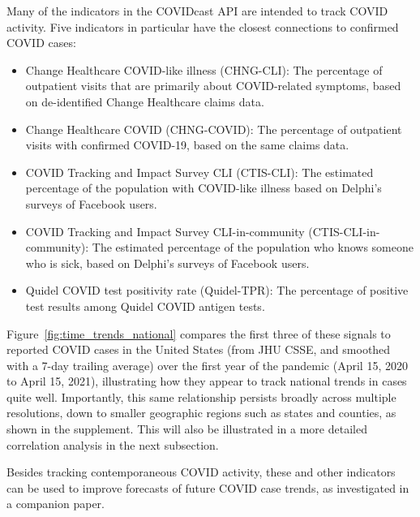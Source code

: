 \documentclass[9pt,twocolumn,twoside,lineno]{pnas-new}
\begin{document}
Many of the indicators in the COVIDcast API are intended to track COVID
activity. Five indicators in particular have the closest connections to
confirmed COVID cases:
\begin{itemize}
\item Change Healthcare COVID-like illness (CHNG-CLI): The percentage of
  outpatient visits that are primarily about COVID-related symptoms, based on
  de-identified Change Healthcare claims data.
\item Change Healthcare COVID (CHNG-COVID): The percentage of outpatient visits
  with confirmed COVID-19, based on the same claims data.
\item COVID Tracking and Impact Survey CLI (CTIS-CLI): The estimated percentage
  of the population with COVID-like illness based on Delphi's surveys of
  Facebook users.
\item COVID Tracking and Impact Survey CLI-in-community (CTIS-CLI-in-community):
  The estimated percentage of the population who knows someone who is sick,
  based on Delphi's surveys of Facebook users.
\item Quidel COVID test positivity rate (Quidel-TPR): The percentage of positive
  test results among Quidel COVID antigen tests.
\end{itemize}
Figure~\ref{fig:time_trends_national} compares the first three of these signals
to reported COVID cases in the United States (from JHU CSSE, and smoothed with a
7-day trailing average) over the first year of the pandemic (April 15, 2020 to
April 15, 2021), illustrating how they  appear to track national trends in cases
quite well. Importantly, this same relationship persists broadly across multiple
resolutions, down to smaller geographic regions such as states and counties, as
shown in the supplement. This will also be illustrated in a more detailed
correlation analysis in the next subsection.


Besides tracking contemporaneous COVID activity, these and other indicators can
be used to improve forecasts of future COVID case trends, as investigated in a
companion paper.

\end{document}
